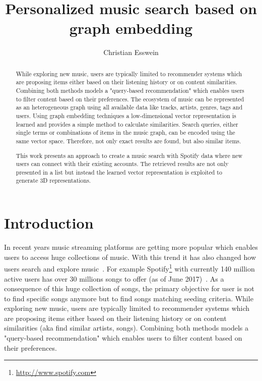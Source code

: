 \documentclass[sigconf]{acmart}
\begin{document}
\title{Personalized music search based on graph embedding}


\author{Christian Esswein}


\begin{abstract}
	While exploring new music, users are typically limited to recommender systems which are proposing items either based on their listening history or on content similarities. Combining both methods models a "query-based recommendation" which enables users to filter content based on their preferences.
	The ecosystem of music can be represented as an heterogeneous graph using all available data like tracks, artists, genres, tags and users. Using graph embedding techniques a low-dimensional vector representation is learned and provides a simple method to calculate similarities. Search queries, either single terms or combinations of items in the music graph, can be encoded using the same vector space. Therefore, not only exact results are found, but also similar items.
	
	This work presents an approach to create a music search with Spotify data where new users can connect with their existing accounts. The retrieved results are not only presented in a list but instead the learned vector representation is exploited to generate 3D representations.
\end{abstract}



\maketitle

\section{Introduction}
In recent years music streaming platforms are getting more popular which enables users to access huge collections of music. With this trend it has also changed how users search and explore music~\cite{lee2016look}. For example Spotify\footnote{\url{http://www.spotify.com}} with currently 140 million active users has over 30 millions songs to offer (as of June 2017)~\cite{aboutSpotify}. As a consequence of this huge collection of songs, the primary objective for user is not to find specific songs anymore but to find songs matching seeding criteria. 
While exploring new music, users are typically limited to recommender systems which are proposing items either based on their listening history or on content similarities (aka find similar artists, songs). Combining both methods models a "query-based recommendation" which enables users to filter content based on their preferences.
\end{document}
